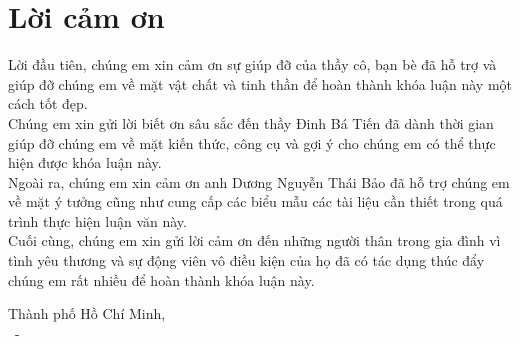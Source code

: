 \chapter*{Lời cảm ơn}
\label{thanks}

Lời đầu tiên, chúng em xin cảm ơn sự giúp đỡ của thầy cô, bạn bè đã hỗ trợ và giúp đỡ chúng em về mặt vật chất và tinh thần để hoàn thành khóa luận này một cách tốt đẹp. \\

Chúng em xin gửi lời biết ơn sâu sắc đến thầy Đinh Bá Tiến đã dành thời gian giúp đỡ chúng em về mặt kiến thức, công cụ và gợi ý cho chúng em có thể thực hiện được khóa luận này. \\

Ngoài ra, chúng em xin cảm ơn anh Dương Nguyễn Thái Bảo đã hỗ trợ chúng em về mặt ý tưởng cũng như cung cấp các biểu mẫu các tài liệu cần thiết trong quá trình thực hiện luận văn này. \\

Cuối cùng, chúng em xin gửi lời cảm ơn đến những người thân trong gia đình vì tình yêu thương và sự động viên vô điều kiện của họ đã có tác dụng thúc đẩy chúng em rất nhiều để hoàn thành khóa luận này. \\ [2cm]

\begin{flushright}
	Thành phố Hồ Chí Minh, \releaseDate \\
	\firstStudent~-~\secondStudent
\end{flushright}